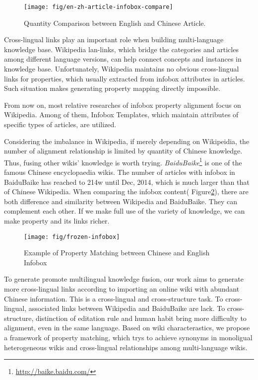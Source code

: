 \documentclass[runningheads,a4paper]{llncs}
\begin{document}
\begin{figure}[h]
  \centering
  \texttt{[image: fig/en-zh-article-infobox-compare]}
  \caption{Quantity Comparison between English and Chinese Article.}
  \label{fig:en-zh-article-infobox-compare}
\end{figure}

Cross-lingual links play an important role when building multi-language knowledge base. Wikipedia lan-links, which bridge the categories and articles among different language versions, can help connect concepts and instances in knowledge base. Unfortunately, Wikipedia maintains no obvious cross-lingual links for properties, which usually extracted from infobox attributes in articles. Such situation makes generating property mapping directly impossible.

From now on, most relative researches of infobox property alignment focus on Wikipedia. Among of them, Infobox Templates, which maintain attributes of specific types of articles, are utilized. 

Considering the imbalance in Wikipedia, if merely depending on Wikipeidia, the number of alignment relationship is limited by quantity of Chinese knowledge. Thus, fusing other wikis' knowledge is worth trying. \emph{BaiduBaike}\footnote{\url{http://baike.baidu.com/}} is one of the famous Chinese encyclopaedia wikis. The number of articles with infobox in BaiduBaike has reached to 214w until Dec, 2014, which is much larger than that of Chinese Wikipedia. When comparing the infobox content( Figure\ref{fig:frozen-infobox}), there are both difference and similarity between Wikipedia and BaiduBaike. They can complement each other. If we make full use of the variety of knowledge, we can make property and its links richer.

\begin{figure}[h]
  \centering
  \texttt{[image: fig/frozen-infobox]}
  \caption{Example of Property Matching between Chinese and English Infobox}
  \label{fig:frozen-infobox}
\end{figure}

To generate promote multilingual knowledge fusion, our work aims to generate more cross-lingual links according to importing an online wiki with abundant Chinese information. This is a cross-lingual and cross-structure task. To cross-lingual, associated links between Wikipedia and BaiduBaike are lack. To cross-structure, distinction of editation rule and human habit bring more difficulty to alignment, even in the same language. Based on wiki characterastics, we propose a framework of property matching, which trys to achieve synonyms in monoligual heterogeneous wikis and cross-lingual relationships among multi-language wikis.
\end{document}
